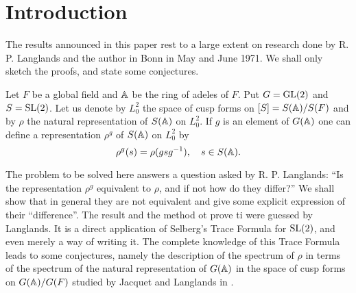 \section*{Introduction}


The results announced in this paper rest to a large extent on research done by
R. P. Langlands and the author in Bonn in May and June 1971. We shall only
sketch the proofs, and state some conjectures.

Let $F$ be a global field and $\mathbb{A}$ be the ring of adeles of $F$. 
Put $G = \mathrm{GL}(2)$ and $S = \mathrm{SL}(2)$.
Let us denote by $L_0^2$ the space of cusp forms on $[S] = S(\mathbb{A}) / S(F)$ and by $\rho$ the natural representation of $S(\mathbb{A})$ on $L_0^2$.
If $g$ is an element of $G(\mathbb{A})$ one can define a representation $\rho^g$ of $S(\mathbb{A})$ on $L_0^2$ by
\[
    \rho^g(s) = \rho(g s g^{-1}), \quad s \in S(\mathbb{A}).
\]

The problem to be solved here answers a question asked by R. P. Langlands: ``Is the representation $\rho^g$ equivalent to $\rho$, and if not how do they differ?''
We shall show that in general they are not equivalent and give some explicit expression of their ``difference''.
The result and the method ot prove ti were guessed by Langlands.
It is a direct application of Selberg's Trace Formula for $\mathrm{SL}(2)$, and even merely a way of writing it.
The complete knowledge of this Trace Formula leads to some conjectures, namely the description of the spectrum of $\rho$ in terms of the spectrum of the natural representation of $G(\mathbb{A})$ in the space of cusp forms on $G(\mathbb{A}) / G(F)$ studied by Jacquet and Langlands in \cite{jacquet1970automorphic}.
